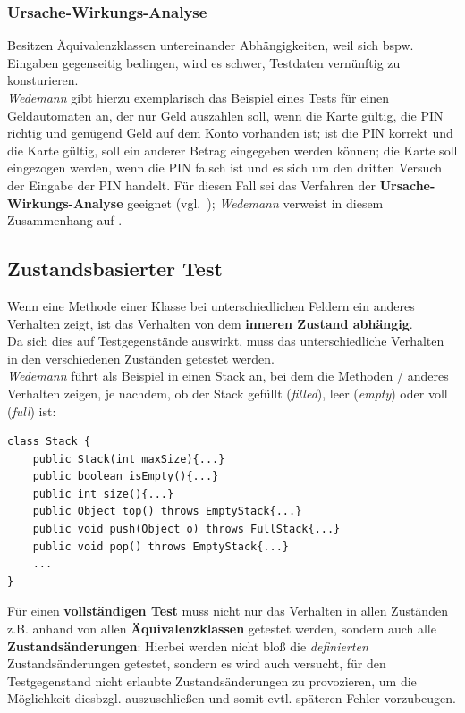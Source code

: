 \subsubsection*{Ursache-Wirkungs-Analyse}
Besitzen Äquivalenzklassen untereinander Abhängigkeiten, weil sich bspw. Eingaben gegenseitig bedingen, wird es schwer, Testdaten vernünftig zu konsturieren.\\
\textit{Wedemann} gibt hierzu exemplarisch das Beispiel eines Tests für einen Geldautomaten an, der nur Geld auszahlen soll, wenn die Karte gültig, die PIN richtig und genügend Geld auf dem Konto vorhanden ist; ist die PIN korrekt und die Karte gültig, soll ein anderer Betrag eingegeben werden können; die Karte soll eingezogen werden, wenn die PIN falsch ist und es sich um den dritten Versuch der Eingabe der PIN handelt. Für diesen Fall sei das Verfahren der \textbf{Ursache-Wirkungs-Analyse} geeignet (vgl.~\cite[46]{Wed09c}); \textit{Wedemann} verweist in diesem Zusammenhang auf \cite{ST05}.


\subsection{Zustandsbasierter Test}\label{subsec:zustandsbasierter-test}
Wenn eine Methode einer Klasse bei unterschiedlichen Feldern ein anderes Verhalten zeigt, ist das Verhalten von dem \textbf{inneren Zustand abhängig}.\\
Da sich dies auf Testgegenstände auswirkt, muss das unterschiedliche Verhalten in den verschiedenen Zuständen getestet werden.\\
\textit{Wedemann} führt als Beispiel in \cite[46 ff.]{Wed09c} einen Stack an, bei dem die Methoden  /  anderes Verhalten zeigen, je nachdem, ob der Stack gefüllt (\textit{filled}), leer (\textit{empty}) oder voll (\textit{full}) ist:

\begin{verbatim}
class Stack {
    public Stack(int maxSize){...}
    public boolean isEmpty(){...}
    public int size(){...}
    public Object top() throws EmptyStack{...}
    public void push(Object o) throws FullStack{...}
    public void pop() throws EmptyStack{...}
    ...
}
\end{verbatim}

Für einen \textbf{vollständigen Test} muss nicht nur das Verhalten in allen Zuständen z.B. anhand von allen \textbf{Äquivalenzklassen} getestet werden, sondern auch alle \textbf{Zustandsänderungen}: Hierbei werden nicht bloß die \textit{definierten} Zustandsänderungen getestet, sondern es wird auch versucht, für den Testgegenstand nicht erlaubte Zustandsänderungen zu provozieren, um die Möglichkeit diesbzgl. auszuschließen und somit evtl. späteren Fehler vorzubeugen. \\

